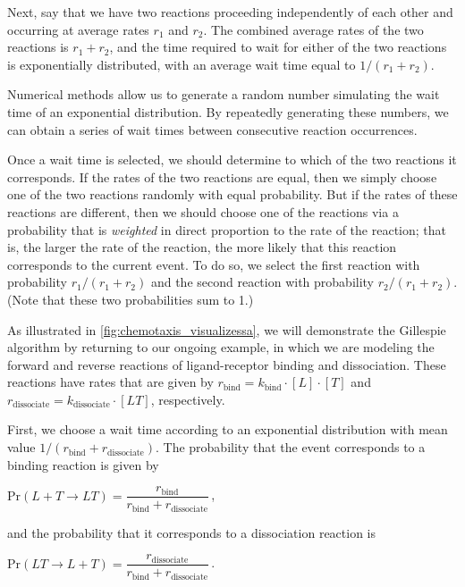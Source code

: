 Next, say that we have two reactions proceeding independently of each other and occurring at average rates $r_1$ and $r_2$. The combined average rates of the two reactions is $r_1 + r_2$, and the time required to wait for either of the two reactions is exponentially distributed, with an average wait time equal to $1/(r_1 + r_2)$.

Numerical methods allow us to generate a random number simulating the wait time of an exponential distribution. By repeatedly generating these numbers, we can obtain a series of wait times between consecutive reaction occurrences.

Once a wait time is selected, we should determine to which of the two reactions it corresponds. If the rates of the two reactions are equal, then we simply choose one of the two reactions randomly with equal probability. But if the rates of these reactions are different, then we should choose one of the reactions via a probability that is \textit{weighted} in direct proportion to the rate of the reaction; that is, the larger the rate of the reaction, the more likely that this reaction corresponds to the current event. To do so, we select the first reaction with probability $r_1/(r_1 + r_2)$ and the second reaction with probability $r_2/(r_1 + r_2)$. (Note that these two probabilities sum to 1.)

As illustrated in \autoref{fig:chemotaxis_visualizessa}, we will demonstrate the Gillespie algorithm by returning to our ongoing example, in which we are modeling the forward and reverse reactions of ligand-receptor binding and dissociation. These reactions have rates that are given by $r_\text{bind} = k_\text{bind} \cdot [L] \cdot [T]$ and $r_\text{dissociate} = k_\text{dissociate} \cdot [LT]$, respectively.

First, we choose a wait time according to an exponential distribution with mean value $1/(r_\text{bind} + r_\text{dissociate})$. The probability that the event corresponds to a binding reaction is given by

\begin{center}
$\mathrm{Pr}(L + T \rightarrow LT) = \dfrac{r_\text{bind}}{r_\text{bind} + r_\text{dissociate}}$\,,
\end{center}

\noindent and the probability that it corresponds to a dissociation reaction is

\begin{center}
$\mathrm{Pr}(LT \rightarrow L + T) = \dfrac{r_\text{dissociate}}{r_\text{bind} + r_\text{dissociate}}$\,.
\end{center}

